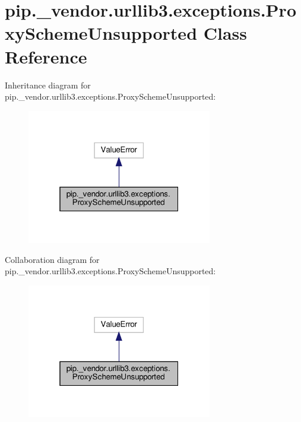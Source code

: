 \hypertarget{classpip_1_1__vendor_1_1urllib3_1_1exceptions_1_1ProxySchemeUnsupported}{}\section{pip.\+\_\+vendor.\+urllib3.\+exceptions.\+Proxy\+Scheme\+Unsupported Class Reference}
\label{classpip_1_1__vendor_1_1urllib3_1_1exceptions_1_1ProxySchemeUnsupported}


Inheritance diagram for pip.\+\_\+vendor.\+urllib3.\+exceptions.\+Proxy\+Scheme\+Unsupported\+:
\nopagebreak
\begin{figure}[H]
\begin{center}
\leavevmode
\includegraphics[width=229pt]{classpip_1_1__vendor_1_1urllib3_1_1exceptions_1_1ProxySchemeUnsupported__inherit__graph}
\end{center}
\end{figure}


Collaboration diagram for pip.\+\_\+vendor.\+urllib3.\+exceptions.\+Proxy\+Scheme\+Unsupported\+:
\nopagebreak
\begin{figure}[H]
\begin{center}
\leavevmode
\includegraphics[width=229pt]{classpip_1_1__vendor_1_1urllib3_1_1exceptions_1_1ProxySchemeUnsupported__coll__graph}
\end{center}
\end{figure}


